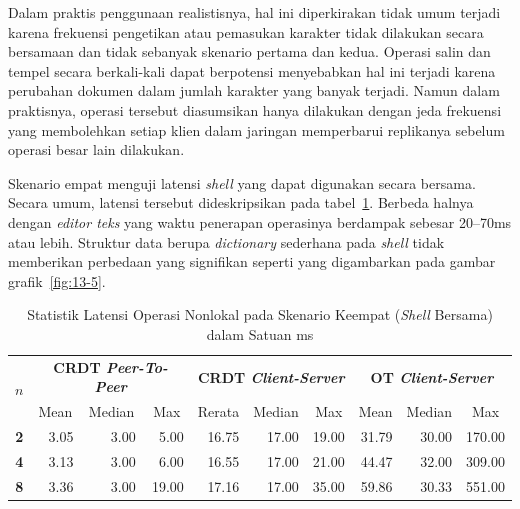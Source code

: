 Dalam praktis penggunaan realistisnya, hal ini diperkirakan tidak umum terjadi karena frekuensi pengetikan atau pemasukan karakter tidak dilakukan secara bersamaan dan tidak sebanyak skenario pertama dan kedua. Operasi salin dan tempel secara berkali-kali dapat berpotensi menyebabkan hal ini terjadi karena perubahan dokumen dalam jumlah karakter yang banyak terjadi. Namun dalam praktisnya, operasi tersebut diasumsikan hanya dilakukan dengan jeda frekuensi yang membolehkan setiap klien dalam jaringan memperbarui replikanya sebelum operasi besar lain dilakukan.

Skenario empat menguji latensi \textit{shell} yang dapat digunakan secara bersama. Secara umum, latensi tersebut dideskripsikan pada tabel~\ref{tab:latency-4}. Berbeda halnya dengan \textit{editor teks} yang waktu penerapan operasinya berdampak sebesar 20--70ms atau lebih. Struktur data berupa \textit{dictionary} sederhana pada \textit{shell} tidak memberikan perbedaan yang signifikan seperti yang digambarkan pada gambar grafik~\ref{fig:13-5}.

\begin{table}[H]
 \centering
\begin{tabular}{|c|rrr|rrr|rrr|}
\hline
\multirow{2}{*}{$n$} & \multicolumn{3}{c|}{\textbf{CRDT \textit{Peer-To-Peer}}} & \multicolumn{3}{c|}{\textbf{CRDT \textit{Client-Server}}} & \multicolumn{3}{c|}{\textbf{OT \textit{Client-Server}}} \\ \cline{2-10}
 & \multicolumn{1}{c|}{Mean} & \multicolumn{1}{c|}{Median} & \multicolumn{1}{c|}{Max} & \multicolumn{1}{c|}{Rerata} & \multicolumn{1}{c|}{Median} & \multicolumn{1}{c|}{Max} & \multicolumn{1}{c|}{Mean} & \multicolumn{1}{c|}{Median} & \multicolumn{1}{c|}{Max} \\ \hline
\textbf{2} & \multicolumn{1}{r|}{3.05} & \multicolumn{1}{r|}{3.00} & 5.00 & \multicolumn{1}{r|}{16.75} & \multicolumn{1}{r|}{17.00} & 19.00 & \multicolumn{1}{r|}{31.79} & \multicolumn{1}{r|}{30.00} & 170.00 \\ \hline
\textbf{4} & \multicolumn{1}{r|}{3.13} & \multicolumn{1}{r|}{3.00} & 6.00 & \multicolumn{1}{r|}{16.55} & \multicolumn{1}{r|}{17.00} & 21.00 & \multicolumn{1}{r|}{44.47} & \multicolumn{1}{r|}{32.00} & 309.00 \\ \hline
\textbf{8} & \multicolumn{1}{r|}{3.36} & \multicolumn{1}{r|}{3.00} & 19.00 & \multicolumn{1}{r|}{17.16} & \multicolumn{1}{r|}{17.00} & 35.00 & \multicolumn{1}{r|}{59.86} & \multicolumn{1}{r|}{30.33} & 551.00 \\ \hline
\end{tabular}
 \caption{Statistik Latensi Operasi Nonlokal pada Skenario Keempat (\textit{Shell} Bersama) dalam Satuan ms}
 \label{tab:latency-4}
\end{table}

